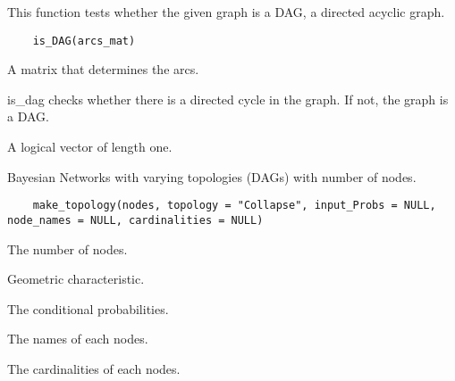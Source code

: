 \documentclass[letterpaper]{book}
\begin{document}
%
\begin{SeeAlso}\relax
{}
\end{SeeAlso}
%
\begin{Description}\relax
This function tests whether the given graph is a DAG, a directed acyclic graph.
\end{Description}
%
\begin{Usage}
\begin{verbatim}
	is_DAG(arcs_mat)
\end{verbatim}
\end{Usage}
%
\begin{Arguments}
\begin{ldescription}
\item[\code{arcs\_mat}]  A matrix that determines the arcs. 
\end{ldescription}
\end{Arguments}
%
\begin{Details}\relax
is\_dag checks whether there is a directed cycle in the graph. If not, the graph is a DAG.
\end{Details}
%
\begin{Value}
A logical vector of length one.
\end{Value}
%
\begin{SeeAlso}\relax
{}
\end{SeeAlso}
%
\begin{Description}\relax
Bayesian Networks with varying topologies (DAGs) with number of nodes.
\end{Description}
%
\begin{Usage}
\begin{verbatim}
	make_topology(nodes, topology = "Collapse", input_Probs = NULL, node_names = NULL, cardinalities = NULL)
\end{verbatim}
\end{Usage}
%
\begin{Arguments}
\begin{ldescription}
\item[\code{nodes}]  The number of nodes. 
\item[\code{topology}]  Geometric characteristic. 
\item[\code{input\_Probs}]  The conditional probabilities. 
\item[\code{node\_names}]  The names of each nodes. 
\item[\code{cardinalities}]  The cardinalities of each nodes. 
\end{ldescription}
\end{Arguments}
\end{document}
